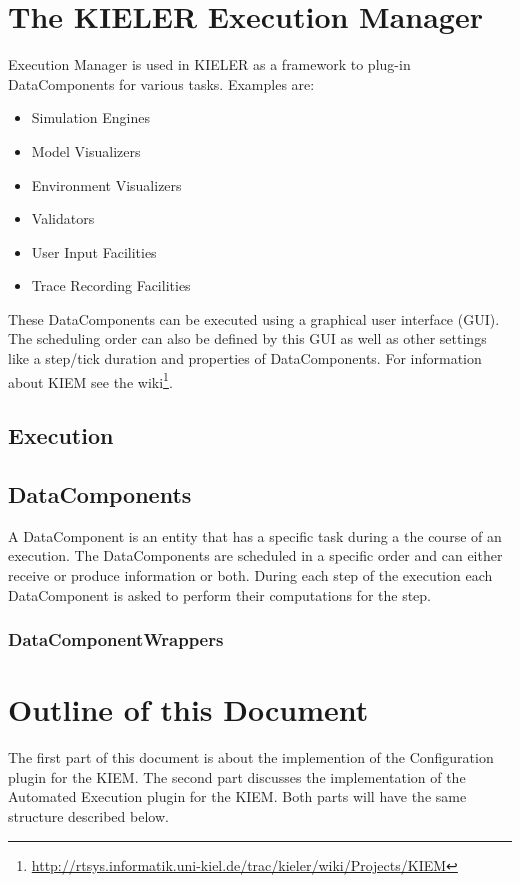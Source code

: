 \section{The KIELER Execution Manager}
\label{sec:introKiem}
Execution Manager is used in KIELER as a framework to plug-in DataComponents for various tasks. Examples are:
\begin{itemize}
 \item Simulation Engines
 \item Model Visualizers
 \item Environment Visualizers
 \item Validators
 \item User Input Facilities
 \item Trace Recording Facilities 
\end{itemize}

These DataComponents can be executed using a graphical user interface (GUI). 
The scheduling order can also be defined by this GUI as well as other settings like a step/tick duration and properties of DataComponents.
For information about \ac{KIEM} see the wiki\footnote{\url{http://rtsys.informatik.uni-kiel.de/trac/kieler/wiki/Projects/KIEM}}.

\subsection{Execution}
\label{section:IntroExecution}


\subsection{DataComponents}
\label{section:IntroDataComponent}
A DataComponent is an entity that has a specific task during a the course of an execution. The
DataComponents are scheduled in a specific order and can either receive or produce information or both. 
During each step of the execution each DataComponent is asked to perform their computations for the step.

\subsubsection{DataComponentWrappers}
\label{section:IntroDataComponentWrapper}





\section{Outline of this Document}
\label{sec:introOutline}
The first part of this document is about the implemention of the Configuration plugin for the \ac{KIEM}.
The second part discusses the implementation of the Automated Execution plugin for the \ac{KIEM}. Both
parts will have the same structure described below.

